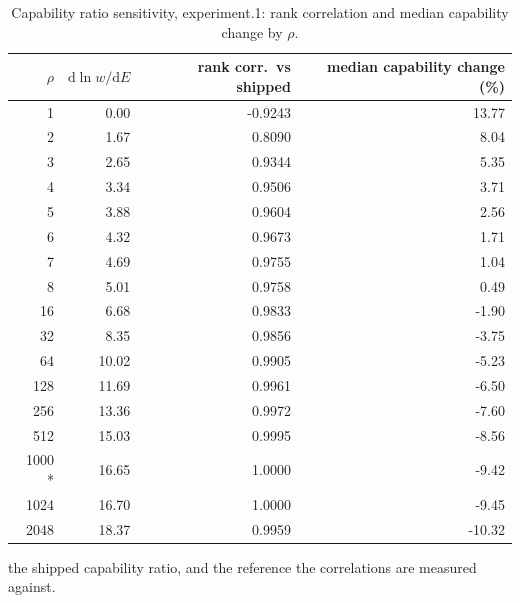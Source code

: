 \begin{table}[htbp]
  \centering
  \caption{Capability ratio sensitivity, experiment.1: rank correlation and median capability change by $\rho$.}
  \label{tab:rho-experiment-1-summary}
  \begin{tabular}{r r r r}
    \toprule
    $\rho$ & $\mathrm{d}\ln w/\mathrm{d}E$ & rank corr.\ vs shipped & median capability change (\%) \\
    \midrule
    1 & 0.00 & -0.9243 & 13.77 \\
    2 & 1.67 & 0.8090 & 8.04 \\
    3 & 2.65 & 0.9344 & 5.35 \\
    4 & 3.34 & 0.9506 & 3.71 \\
    5 & 3.88 & 0.9604 & 2.56 \\
    6 & 4.32 & 0.9673 & 1.71 \\
    7 & 4.69 & 0.9755 & 1.04 \\
    8 & 5.01 & 0.9758 & 0.49 \\
    16 & 6.68 & 0.9833 & -1.90 \\
    32 & 8.35 & 0.9856 & -3.75 \\
    64 & 10.02 & 0.9905 & -5.23 \\
    128 & 11.69 & 0.9961 & -6.50 \\
    256 & 13.36 & 0.9972 & -7.60 \\
    512 & 15.03 & 0.9995 & -8.56 \\
    1000 * & 16.65 & 1.0000 & -9.42 \\
    1024 & 16.70 & 1.0000 & -9.45 \\
    2048 & 18.37 & 0.9959 & -10.32 \\
    \bottomrule
  \end{tabular}
  \par\smallskip\footnotesize * the shipped capability ratio, and the reference the correlations are measured against.
\end{table}
